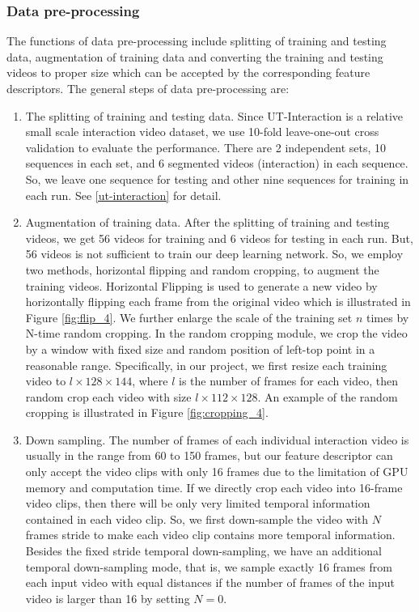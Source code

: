 \subsubsection*{Data pre-processing}
\label{pre_processing}
The functions of data pre-processing include splitting of training and testing data, augmentation of training data and converting the training and testing videos to proper size which can be accepted by the corresponding feature descriptors.  The general steps of data pre-processing are:
\begin{enumerate}
	\item The splitting of training and testing data. Since UT-Interaction is a relative small scale interaction video dataset, we use 10-fold leave-one-out cross validation to evaluate the performance. There are 2 independent sets, 10 sequences in each set, and 6 segmented videos (interaction) in each sequence. So, we leave one sequence for testing and other nine sequences for training in each run. See \ref{ut-interaction} for detail.
	\label{augmentation}
	\item Augmentation of training data.  After the splitting of training and testing videos, we get 56 videos for training and 6 videos for testing in each run. But, 56 videos is not sufficient to train our deep learning network. So, we employ two methods, horizontal flipping and random cropping, to augment the training videos. Horizontal Flipping is used to generate a new video by horizontally flipping each frame from the original video which is illustrated in Figure \ref{fig:flip_4}. We further enlarge the scale of the training set \(n\) times by N-time random cropping. In the random cropping module, we crop the video by a window with fixed size and random position of left-top point in a reasonable range. Specifically, in our project, we first resize each training video to \(l \times 128 \times 144\), where \(l\) is the number of frames for each video, then random crop each video with size \(l \times 112 \times 128\). An example of the random cropping is illustrated in Figure \ref{fig:cropping_4}.
	\label{down-sampling}
	\item Down sampling. The number of frames of each individual interaction video is usually in the range from 60 to 150 frames, but our feature descriptor can only accept the video clips with only 16 frames due to the limitation of GPU memory and computation time. If we directly crop each video into 16-frame video clips, then there will be only very limited temporal information contained in each video clip. So, we first down-sample the video with \(N\) frames stride to make each video clip contains more temporal information. Besides the fixed stride temporal down-sampling, we have an additional temporal down-sampling mode, that is, we  sample exactly 16 frames from each input video with equal distances if the number of frames of the input video is larger than 16 by setting \(N=0\).  
	

\end{enumerate}
